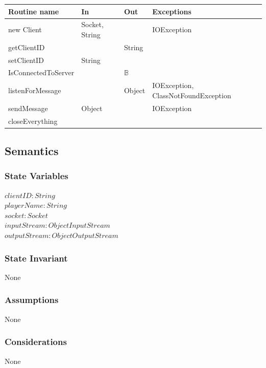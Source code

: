 \documentclass[12pt, titlepage]{article}
\begin{document}
        \begin{tabular}{| l | l | l | p{6cm} |}
            \hline
            \textbf{Routine name} & \textbf{In} & \textbf{Out} & \textbf{Exceptions}\\
            \hline
            new Client & Socket, String &  & IOException\\
            \hline
            getClientID &  & String & \\
            \hline 
            setClientID & String &  &\\
            \hline 
            IsConnectedToServer & & $\mathbb{B}$ &\\
            \hline 
            listenForMessage & & Object & IOException, ClassNotFoundException\\
            \hline 
            sendMessage & Object & & IOException\\
            \hline 
            closeEverything &  &  &\\
            \hline
        \end{tabular}
        
    \subsection* {Semantics}
    
    \subsubsection* {State Variables}
        $\mathit{clientID}: String$\\
        $\mathit{playerName}: String$\\
        $\mathit{socket} : Socket$\\
        $\mathit{inputStream}: ObjectInputStream$\\
        $\mathit{outputStream} : ObjectOutputStream$\\

    \subsubsection* {State Invariant}
        None
    
    \subsubsection* {Assumptions}
        None
    
    \subsubsection* {Considerations}
        None
    
\end{document}
